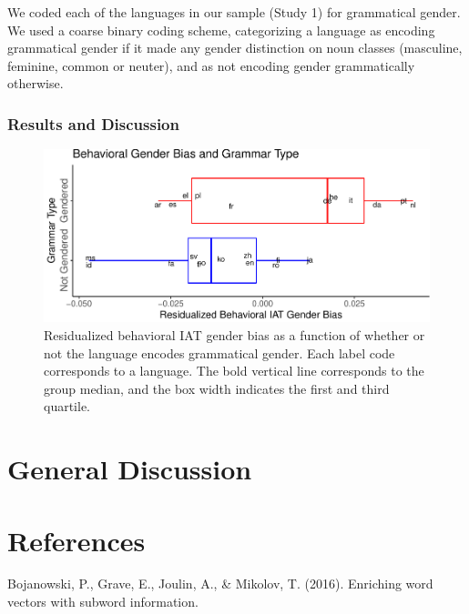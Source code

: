 \documentclass[man,floatsintext]{apa6}
\theoremstyle{definition}
\theoremstyle{definition}
\theoremstyle{definition}
\theoremstyle{remark}
\begin{document}
We coded each of the languages in our sample (Study 1) for grammatical
gender. We used a coarse binary coding scheme, categorizing a language
as encoding grammatical gender if it made any gender distinction on noun
classes (masculine, feminine, common or neuter), and as not encoding
gender grammatically otherwise.

\subsubsection{Results and Discussion}\label{results-and-discussion-1}

\begin{figure}
\centering
\includegraphics{iat_lang_files/figure-latex/unnamed-chunk-18-1.pdf}
\caption{\label{fig:unnamed-chunk-18}Residualized behavioral IAT gender bias
as a function of whether or not the language encodes grammatical gender.
Each label code corresponds to a language. The bold vertical line
corresponds to the group median, and the box width indicates the first
and third quartile.}
\end{figure}

\section{General Discussion}\label{general-discussion}

\newpage

\section{References}\label{references}

\begingroup
\setlength{\parindent}{-0.5in} \setlength{\leftskip}{0.5in}

\hypertarget{refs}{}
\hypertarget{ref-bojanowski2016enriching}{}
Bojanowski, P., Grave, E., Joulin, A., \& Mikolov, T. (2016). Enriching
word vectors with subword information.
\end{document}
